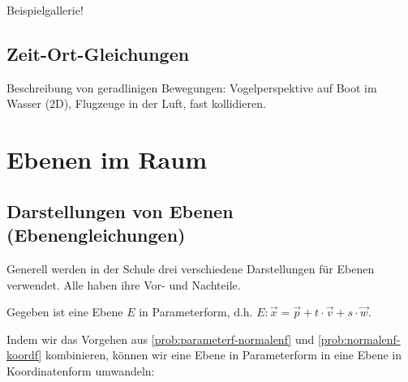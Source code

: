 Beispielgallerie!

\subsection{Zeit-Ort-Gleichungen}
Beschreibung von geradlinigen Bewegungen: Vogelperspektive auf Boot im Wasser (2D), Flugzeuge in der Luft, fast kollidieren. 

\section{Ebenen im Raum}

\subsection{Darstellungen von Ebenen (Ebenengleichungen)}
Generell werden in der Schule drei verschiedene Darstellungen für Ebenen verwendet. Alle haben ihre Vor- und Nachteile. 

\begin{problem} \label{prob:parameterf-normalenf}
    
\end{problem}

\begin{problem} \label{prob:normalenf-koordf}
    Gegeben ist eine Ebene \(E\) in Parameterform, d.h. \(E: \vec x = \vec p + t \cdot \vec v + s\cdot \vec w\). 
\end{problem}

Indem wir das Vorgehen aus \cref{prob:parameterf-normalenf} und \cref{prob:normalenf-koordf} kombinieren, können wir eine Ebene in Parameterform in eine Ebene in Koordinatenform umwandeln: 

\begin{problem}
    
\end{problem}

